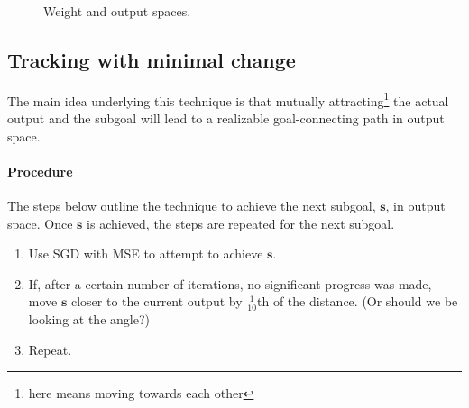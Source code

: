 \documentclass{article}
\renewcommand\vec{\mathbf}
\begin{document}
\begin{figure}[h]
    \vspace{.05\textwidth}
    \caption{Weight and output spaces.}
    \label{fig:sem2_week4:stripe:weights}
\end{figure}

\subsection{Tracking with minimal change}
The main idea underlying this technique is that mutually attracting\footnote{ here means moving towards each other} the actual output and the subgoal will lead to a realizable goal-connecting path in output space. 

\paragraph{Procedure}
The steps below outline the technique to achieve the next subgoal, $\vec{s}$, in output space. 
Once $\vec{s}$ is achieved, the steps are repeated for the next subgoal. 
\begin{enumerate}
    \item Use SGD with MSE to attempt to achieve $\vec{s}$.
    \item If, after a certain number of iterations, no significant progress was made, move $\vec{s}$ closer to the current output by $\frac{1}{10}$th of the distance. (Or should we be looking at the angle?)
    \item Repeat.
\end{enumerate}
\end{document}
